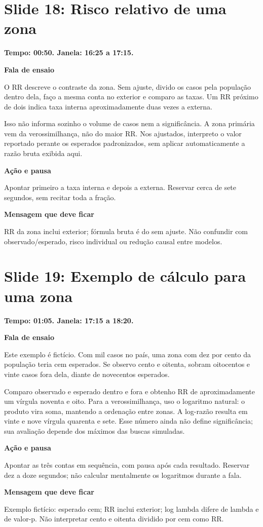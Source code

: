 \documentclass[11pt,a4paper]{article}
\newcommand{\bloco}[1]{\par\Needspace{3\baselineskip}\textbf{#1}\par}
\newcommand{\slide}[2]{\Needspace{13\baselineskip}\section*{Slide #1: #2}}
\begin{document}
\par\begin{minipage}{\textwidth}
\slide{18}{Risco relativo de uma zona}
{\color{azul}\textbf{Tempo: 00:50. Janela: 16:25 a 17:15.}}\par
\bloco{Fala de ensaio}
O RR descreve o contraste da zona. Sem ajuste, divido os casos pela população dentro dela, faço a mesma conta no exterior e comparo as taxas. Um RR próximo de dois indica taxa interna aproximadamente duas vezes a externa.

Isso não informa sozinho o volume de casos nem a significância. A zona primária vem da verossimilhança, não do maior RR. Nos ajustados, interpreto o valor reportado perante os esperados padronizados, sem aplicar automaticamente a razão bruta exibida aqui.
\bloco{Ação e pausa}
Apontar primeiro a taxa interna e depois a externa. Reservar cerca de sete segundos, sem recitar toda a fração.
\bloco{Mensagem que deve ficar}
RR da zona inclui exterior; fórmula bruta é do sem ajuste. Não confundir com observado/esperado, risco individual ou redução causal entre modelos.
\end{minipage}\par\bigskip
\par\begin{minipage}{\textwidth}
\slide{19}{Exemplo de cálculo para uma zona}
{\color{azul}\textbf{Tempo: 01:05. Janela: 17:15 a 18:20.}}\par
\bloco{Fala de ensaio}
Este exemplo é fictício. Com mil casos no país, uma zona com dez por cento da população teria cem esperados. Se observo cento e oitenta, sobram oitocentos e vinte casos fora dela, diante de novecentos esperados.

Comparo observado e esperado dentro e fora e obtenho RR de aproximadamente um vírgula noventa e oito. Para a verossimilhança, uso o logaritmo natural: o produto vira soma, mantendo a ordenação entre zonas. A log-razão resulta em vinte e nove vírgula quarenta e sete. Esse número ainda não define significância; sua avaliação depende dos máximos das buscas simuladas.
\bloco{Ação e pausa}
Apontar as três contas em sequência, com pausa após cada resultado. Reservar dez a doze segundos; não calcular mentalmente os logaritmos durante a fala.
\bloco{Mensagem que deve ficar}
Exemplo fictício: esperado cem; RR inclui exterior; log lambda difere de lambda e de valor-p. Não interpretar cento e oitenta dividido por cem como RR.
\end{minipage}\par\bigskip
\end{document}
